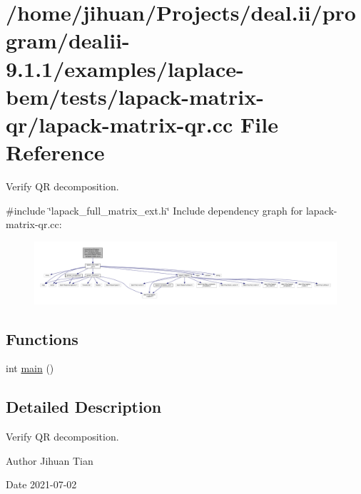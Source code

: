 \hypertarget{lapack-matrix-qr_8cc}{}\section{/home/jihuan/\+Projects/deal.ii/program/dealii-\/9.1.1/examples/laplace-\/bem/tests/lapack-\/matrix-\/qr/lapack-\/matrix-\/qr.cc File Reference}
\label{lapack-matrix-qr_8cc}


Verify QR decomposition.  


{\ttfamily \#include \char`\"{}lapack\+\_\+full\+\_\+matrix\+\_\+ext.\+h\char`\"{}}\newline
Include dependency graph for lapack-\/matrix-\/qr.cc\+:
\nopagebreak
\begin{figure}[H]
\begin{center}
\leavevmode
\includegraphics[width=350pt]{lapack-matrix-qr_8cc__incl}
\end{center}
\end{figure}
\subsection*{Functions}
\begin{DoxyCompactItemize}
\item 
int \hyperlink{lapack-matrix-qr_8cc_ae66f6b31b5ad750f1fe042a706a4e3d4}{main} ()
\end{DoxyCompactItemize}


\subsection{Detailed Description}
Verify QR decomposition. 

\begin{DoxyAuthor}{Author}
Jihuan Tian 
\end{DoxyAuthor}
\begin{DoxyDate}{Date}
2021-\/07-\/02 
\end{DoxyDate}


